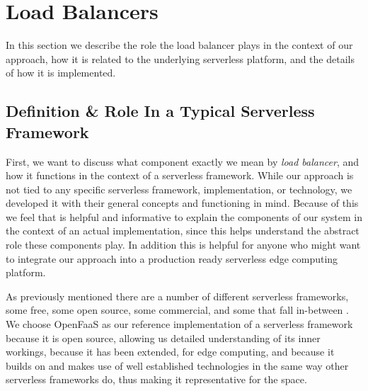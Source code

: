 \section{Load Balancers}
In this section we describe the role the load balancer plays in the context of our approach, how it is related to the underlying serverless platform, and the details of how it is implemented.

\subsection{ Definition \& Role In a Typical Serverless Framework}
First, we want to discuss what component exactly we mean by \textit{load balancer}, and how it functions in the context of a serverless framework. While our approach is not tied to any specific serverless framework, implementation, or technology, we developed it with their general concepts and functioning in mind. Because of this we feel that is helpful and informative to explain the components of our system in the context of an actual implementation, since this helps understand the abstract role these components play. In addition this is helpful for anyone who might want to integrate our approach into a production ready serverless edge computing platform.

As previously mentioned there are a number of different serverless frameworks, some free, some open source, some commercial, and some that fall in-between \cite{aws-lambda}\cite{azure-functions}\cite{openfaas-gateway}\cite{kubeless}\cite{openwhisk}.
We choose OpenFaaS\cite{openfaas}
as our reference implementation of a serverless framework because it is open source, allowing us detailed understanding of its inner workings, because it has been extended, for edge computing, and because it builds on and makes use of well established technologies in the same way other serverless frameworks do\cite{kubeless}\cite{openwhisk}, thus making it representative for the space.


